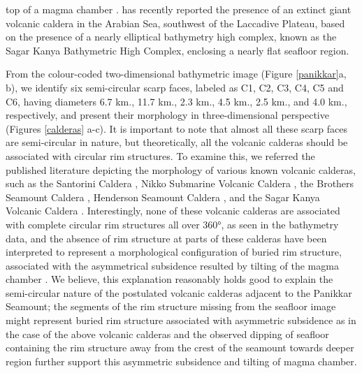 \documentclass[twocolumn]{article}
\begin{document}
\begin{minipage}{\linewidth}
	\vspace{7.5mm} %
	\label{calderas}
	\vspace{4mm} %
\end{minipage}
top of a magma chamber \citep{Cole2005}. \cite{Bijesh2021} has recently reported the presence of an extinct giant volcanic caldera in the Arabian Sea, southwest of the Laccadive Plateau, based on the presence of a nearly elliptical bathymetry high complex, known as the Sagar Kanya Bathymetric High Complex, enclosing a nearly flat seafloor region.

From the colour-coded two-dimensional bathymetric image (Figure \ref{panikkar}a, b), we identify six semi-circular scarp faces, labeled as C1, C2, C3, C4, C5 and C6, having diameters 6.7 km., 11.7 km., 2.3 km., 4.5 km., 2.5 km., and 4.0 km., respectively, and present their morphology in three-dimensional perspective (Figures \ref{calderas} a-c). It is important to note that almost all these scarp faces are semi-circular in nature, but theoretically, all the volcanic calderas should be associated with circular rim structures. To examine this, we referred the published literature depicting the morphology of various known volcanic calderas, such as  the Santorini Caldera \citep{Nomikou2012}, Nikko Submarine Volcanic Caldera \citep{Global_Volcanism_Program1990}, the Brothers Seamount Caldera \citep{Stagpoole2016}, Henderson Seamount Caldera \citep{Taylor1980}, and the Sagar Kanya Volcanic Caldera \citep{Bijesh2021}. Interestingly, none of these volcanic calderas are associated with complete circular rim structures all over 360°, as seen in the bathymetry data, and the absence of rim structure at parts of these calderas have been interpreted to represent a morphological configuration of buried rim structure, associated with the asymmetrical subsidence resulted by tilting of the magma chamber \citep{Kennedy2004}. We believe, this explanation reasonably holds good to explain the semi-circular nature of the postulated volcanic calderas adjacent to the Panikkar Seamount; the segments of the rim structure missing from the seafloor image might represent buried rim structure associated with asymmetric subsidence as in the case of the above volcanic calderas and the observed dipping of seafloor containing the rim structure away from the crest of the seamount towards deeper region further support this asymmetric subsidence and tilting of magma chamber.
\end{document}
